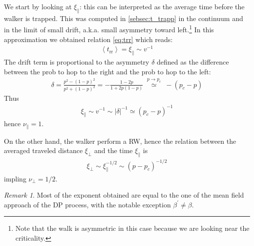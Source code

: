 \documentclass[4apaper,11pt,fleqn]{article}
\theoremstyle{remark}
\newtheorem*{rem}{Remark}
\theoremstyle{definition}
\begin{document}
We start by looking at $\xi_{\parallel}$: this can be interpreted as the average time before the walker is trapped. This was computed in \ref{sebsec:t_trapp} in the continuum and in the limit of small drift, a.k.a. small asymmetry toward left.\footnote{Note that the walk is asymmetric in this case because we are looking near the criticality.}
In this approximation we obtained relation \eqref{eq:trr} which reads:
\begin{align*}
  \left\langle t_{\mathrm{rr}}\right\rangle = \xi_{\parallel} \sim v^{-1}
\end{align*}
The drift term is proportional to the asymmetry $\delta$ defined as the difference between the prob to hop to the right and the prob to hop to the left:
\begin{align*}
  \delta=\frac{p^{2}-(1-p)^{2}}{p^{2}+(1-p)^{2}}=-\frac{1-2 p}{1+2 p(1-p)} \;\overset{p \rightarrow p_c}{\simeq}\; -\left(p_{c}-p\right)
\end{align*}
Thus
\begin{align*}
  \xi_{\parallel} \sim v^{-1} \sim |\delta|^{-1} \simeq (p_c-p)^{-1}
\end{align*}
hence $\nu_\parallel =1$.

On the other hand, the walker perform a RW, hence the relation between the averaged traveled distance $\xi_{\perp}$ and the time $\xi_{\parallel}$ is
\begin{align*}
  \xi_{\perp} \sim \xi_{\parallel}^{-1/2} \sim (p-p_c)^{-1/2}
\end{align*}
impling $\nu_{\perp}=1/2$.

\begin{rem}
  Most of the exponent obtained are equal to the one of the mean field approach of the DP process, with the notable exception $\beta^\prime \neq \beta$.
\end{rem}
\end{document}
